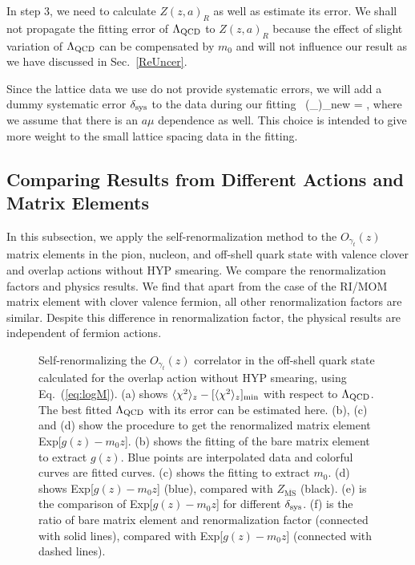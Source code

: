 In step 3, we need to calculate $Z(z,a)_{R}$ as well as estimate its error. We shall not propagate the fitting error of $\Lambda_{\rm QCD}$ to $Z(z,a)_{R}$ because the effect of slight variation of $\Lambda_{\rm QCD}$ can be compensated by $m_{0}$ and will not influence our result as we have discussed in Sec.~\ref{ReUncer}.

Since the lattice data we use do not provide systematic errors, we will add a dummy systematic error $\delta_{\rm sys}$ to the data during our fitting~\cite{Zhang:2020rsx}
\bea\label{eq:error}
(\sigma_{\ln {}})_{\rm new} = ,
\eea
where we assume that there is an $a\mu$ dependence as well.
This choice is intended to give more weight to the small lattice spacing 
data in the fitting.

\subsection{Comparing Results from Different Actions and Matrix Elements}

In this subsection, we apply the self-renormalization method to the $O_{\gamma_t}(z)$ matrix 
elements in the pion, nucleon, and off-shell quark state with valence clover and overlap actions 
without HYP smearing. We compare the renormalization factors and physics results. 
We find that apart from the case of the RI/MOM matrix element with clover valence fermion, all other renormalization factors are similar. Despite this difference in renormalization factor, the physical
results are independent of fermion actions. 


\begin{figure}[tbp]
\centering
{}
\caption{
Self-renormalizing the $O_{\gamma_t}(z)$ correlator in the off-shell quark state calculated for the overlap action without HYP smearing, using Eq.~(\ref{eq:logM}). (a) shows $\langle  \chi^{2} \rangle_{z} - [\langle  \chi^{2} \rangle_{z}]_{\rm min}$ with respect to $\Lambda_{\rm QCD}$. The best fitted $\Lambda_{\rm QCD}$ with its error can be estimated here. (b), (c) and (d) show the procedure to get the renormalized matrix element Exp[$g(z)-m_{0}z$]. (b) shows the fitting of the bare matrix element to extract $g(z)$. Blue points are interpolated data and colorful curves are fitted curves. (c) shows the fitting to extract $m_{0}$. (d) shows Exp[$g(z)-m_{0}z$] (blue), compared with $Z_{\overline{\mathrm{MS}}}$ (black). (e) is the comparison of Exp[$g(z)-m_{0}z$] for different $\delta_{\rm sys}$. (f) is the ratio of bare matrix element and renormalization factor (connected with solid lines), compared with Exp[$g(z)-m_{0}z$] (connected with dashed lines).
}
\label{fig:Re_overlap_quark}
\end{figure}


